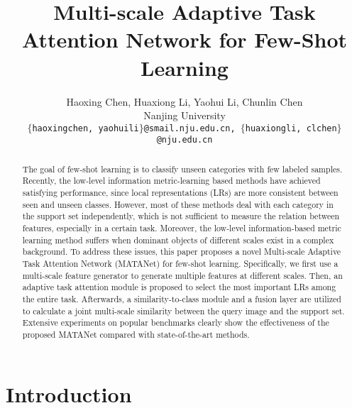 \documentclass[final]{cvpr}
\begin{document}
	
\title{Multi-scale Adaptive Task Attention Network for Few-Shot Learning}
	
	\author{Haoxing Chen, Huaxiong Li, Yaohui Li, Chunlin Chen\\
		Nanjing University\\
		{\tt\small $\lbrace$haoxingchen, yaohuili$\rbrace$@smail.nju.edu.cn, $\lbrace$huaxiongli, clchen$\rbrace$@nju.edu.cn}
}
	
	\maketitle
	
	
	\begin{abstract}
The goal of few-shot learning is to classify unseen categories with few labeled samples. Recently, the low-level information metric-learning based methods have achieved satisfying performance, since local representations (LRs) are more consistent between seen and unseen classes. However, most of these methods deal with each category in the support set independently, which is not sufficient to measure the relation between features, especially in a certain task.  Moreover, the low-level information-based metric learning method suffers when dominant objects of different scales exist in a complex background. To address these issues, this paper proposes a novel Multi-scale Adaptive Task Attention Network (MATANet) for few-shot learning. Specifically, we first use a multi-scale feature generator to generate multiple features at different scales. Then, an adaptive task attention module is proposed to select the most important LRs among the entire task. Afterwards, a similarity-to-class module and a fusion layer are utilized to calculate a joint multi-scale similarity between the query image and the support set. Extensive experiments on popular benchmarks clearly show the effectiveness of the proposed MATANet compared with state-of-the-art methods. 
	\end{abstract}
	


	\section{Introduction}
	
\end{document}

